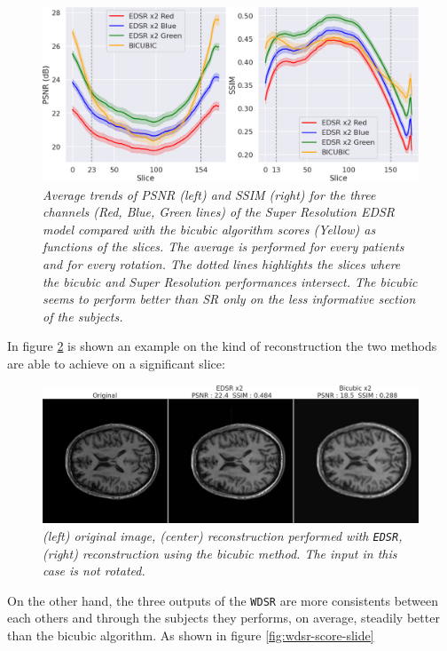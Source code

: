 \documentclass[12pt,a4paper]{report}
\begin{document}
\begin{figure}[H]
  \includegraphics[scale=0.37]{./images/edsr_score_slide.png}
  \caption{\it Average trends of PSNR (left) and SSIM (right) for the three channels (Red, Blue, Green lines) of the Super Resolution EDSR model compared with the bicubic algorithm scores (Yellow) as functions of the slices. The average is performed for every patients and for every rotation. The dotted lines highlights the slices where the bicubic and Super Resolution performances intersect. The bicubic seems to perform better than SR only on the less informative section of the subjects.}
  \label{fig:edsr-score-slide}
\end{figure}

In figure \ref{fig:edsr-upscale} is shown an example on the kind of reconstruction the two methods are able to achieve on a significant slice: 

\begin{figure}[H]
 \centering
 \includegraphics[scale=0.3]{./images/edsr-comp-images.png}
 \caption{\it (left) original image, (center) reconstruction performed with {\tt EDSR}, (right) reconstruction using the bicubic method. The input in this case is not rotated.}
 \label{fig:edsr-upscale}
\end{figure}

On the other hand, the three outputs of the {\tt WDSR} are more consistents between each others and through the subjects they performs, on average, steadily better than the bicubic algorithm. As shown in figure \ref{fig:wdsr-score-slide}    
\end{document}
